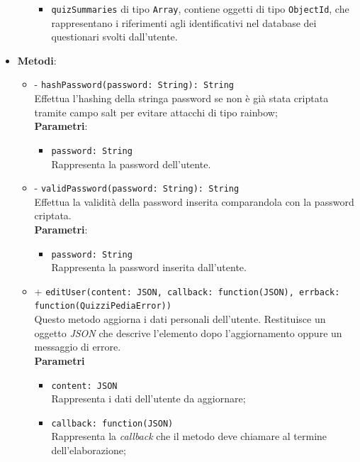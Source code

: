 \begin{itemize}
\begin{itemize}
\begin{itemize}
				\item
					\texttt{quizSummaries} di tipo \texttt{Array}, contiene oggetti di tipo \texttt{ObjectId}, che rappresentano i riferimenti agli identificativi nel database dei questionari svolti dall'utente.		
			\end{itemize}	
		\end{itemize}	
	\item \textbf{Metodi}:
		\begin{itemize}
		\item
		- \texttt{hashPassword(password: String): String} \\
		Effettua l'hashing della stringa password se non è già stata criptata tramite campo salt per evitare attacchi di tipo rainbow; \\
		\textbf{Parametri}: 
			\begin{itemize}
			\item
				 \texttt{password: String} \\
				Rappresenta la password dell'utente.
			\end{itemize}
		\item
		- \texttt{validPassword(password: String): String} \\
		Effettua la validità della password inserita comparandola con la password criptata.	\\
		\textbf{Parametri}: 
			\begin{itemize}
			\item
				\texttt{password: String} \\
				Rappresenta la password inserita dall'utente.
			\end{itemize}
		\item
		+ \texttt{editUser(content: JSON, callback: function(JSON), errback:\\ function(QuizziPediaError))} \\
		Questo metodo aggiorna i dati personali dell'utente. Restituisce un oggetto \textit{JSON} che descrive l'elemento dopo l'aggiornamento oppure un messaggio di errore.	\\
		\textbf{Parametri} 
			\begin{itemize}
			\item
				\texttt{content: JSON} \\
				Rappresenta i dati dell'utente da aggiornare;
			\item	
				\texttt{callback: function(JSON)} \\
				Rappresenta la \textit{callback} che il metodo deve chiamare al termine dell'elaborazione;

\end{itemize}
\end{itemize}
\end{itemize}

